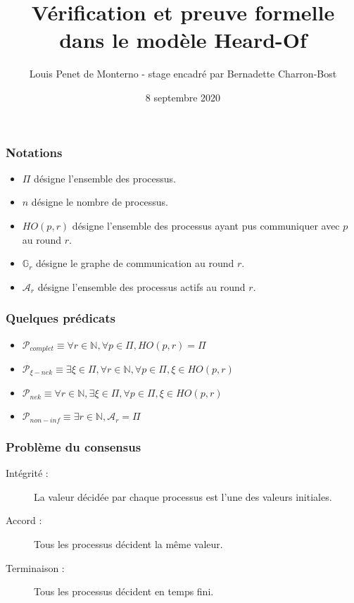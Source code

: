 \documentclass{beamer}
\title{Vérification et preuve formelle dans le modèle Heard-Of}
\date{8 septembre 2020}
\author{Louis Penet de Monterno - stage encadré par Bernadette Charron-Bost}
\begin{document}
\frame{\titlepage}

\begin{frame}
\frametitle{Notations}
\begin{itemize}
	\item $\Pi$ désigne l'ensemble des processus.
	\item $n$ désigne le nombre de processus.
	\item $HO(p, r)$ désigne l'ensemble des processus ayant pus communiquer avec $p$ au round $r$.
	\item $\mathds{G}_r$ désigne le graphe de communication au round $r$.
	\item $\mathcal{A}_r$ désigne l'ensemble des processus actifs au round $r$.
\end{itemize}
\end{frame}

\begin{frame}
\frametitle{Quelques prédicats}
\begin{itemize}
\item $\mathcal{P}_{complet} \equiv \forall r \in \mathds{N}, \forall p \in \Pi, HO(p, r) = \Pi$
\item $\mathcal{P}_{\xi-nek} \equiv \exists \xi \in \Pi, \forall r \in \mathds{N}, \forall p \in \Pi, \xi \in HO(p,r)$
\item $\mathcal{P}_{nek} \equiv \forall r \in \mathds{N}, \exists \xi \in \Pi, \forall p \in \Pi, \xi \in HO(p,r)$
\item $\mathcal{P}_{non-inf} \equiv \exists r \in \mathds{N}, \mathcal{A}_r = \Pi$
\end{itemize}
\end{frame}

\begin{frame}
\frametitle{Problème du consensus}
\begin{description}
	\item[Intégrité :] La valeur décidée par chaque processus est l'une des valeurs initiales.
	\item[Accord :] Tous les processus décident la même valeur.
	\item[Terminaison :] Tous les processus décident en temps fini.
\end{description}
\end{frame}
\end{document}
